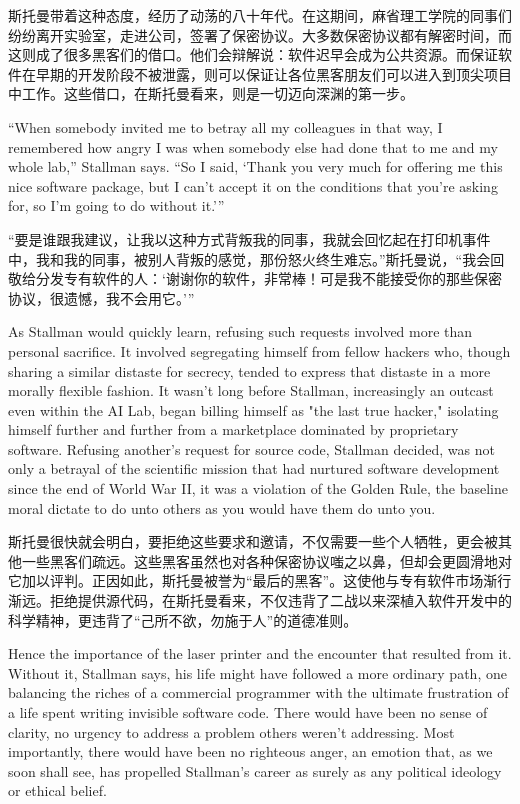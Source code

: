 \ifdefined\chs

斯托曼带着这种态度，经历了动荡的八十年代。在这期间，麻省理工学院的同事们纷纷离开实验室，走进公司，签署了保密协议。大多数保密协议都有解密时间，而这则成了很多黑客们的借口。他们会辩解说：软件迟早会成为公共资源。而保证软件在早期的开发阶段不被泄露，则可以保证让各位黑客朋友们可以进入到顶尖项目中工作。这些借口，在斯托曼看来，则是一切迈向深渊的第一步。
\fi

\ifdefined\eng
``When somebody invited me to betray all my colleagues in that way, I remembered how angry I was when somebody else had done that to me and my whole lab,'' Stallman says. ``So I said, `Thank you very much for offering me this nice software package, but I can't accept it on the conditions that you're asking for, so I'm going to do without it.'\hspace{0.01in}''
\fi

\ifdefined\chs
``要是谁跟我建议，让我以这种方式背叛我的同事，我就会回忆起在打印机事件中，我和我的同事，被别人背叛的感觉，那份怒火终生难忘。''斯托曼说，``我会回敬给分发专有软件的人：`谢谢你的软件，非常棒！可是我不能接受你的那些保密协议，很遗憾，我不会用它。'\hspace{0.01in}''
\fi


\ifdefined\eng
As Stallman would quickly learn, refusing such requests involved more than personal sacrifice. It involved segregating himself from fellow hackers who, though sharing a similar distaste for secrecy, tended to express that distaste in a more morally flexible fashion. It wasn't long before Stallman, increasingly an outcast even within the AI Lab, began billing himself as "the last true hacker," isolating himself further and further from a marketplace dominated by proprietary software. Refusing another's request for source code, Stallman decided, was not only a betrayal of the scientific mission that had nurtured software development since the end of World War II, it was a violation of the Golden Rule, the baseline moral dictate to do unto others as you would have them do unto you. 
\fi

\ifdefined\chs
斯托曼很快就会明白，要拒绝这些要求和邀请，不仅需要一些个人牺牲，更会被其他一些黑客们疏远。这些黑客虽然也对各种保密协议嗤之以鼻，但却会更圆滑地对它加以评判。正因如此，斯托曼被誉为``最后的黑客''。这使他与专有软件市场渐行渐远。拒绝提供源代码，在斯托曼看来，不仅违背了二战以来深植入软件开发中的科学精神，更违背了``己所不欲，勿施于人''的道德准则。
\fi

\ifdefined\eng
Hence the importance of the laser printer and the encounter that resulted from it. Without it, Stallman says, his life might have followed a more ordinary path, one balancing the riches of a commercial programmer with the ultimate frustration of a life spent writing invisible software code. There would have been no sense of clarity, no urgency to address a problem others weren't addressing. Most importantly, there would have been no righteous anger, an emotion that, as we soon shall see, has propelled Stallman's career as surely as any political ideology or ethical belief.
\fi

